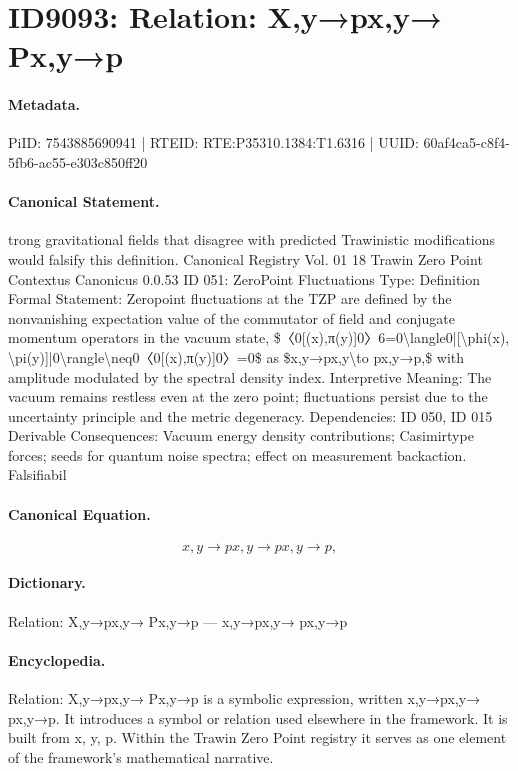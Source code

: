 \section*{ID9093: Relation: X,y→px,y→ Px,y→p}
\paragraph{Metadata.}
PiID: 7543885690941 | RTEID: RTE:P35310.1384:T1.6316 | UUID: 60af4ca5-c8f4-5fb6-ac55-e303c850ff20

\paragraph{Canonical Statement.}
trong gravitational fields that disagree with predicted Trawinistic modifications would falsify this definition. Canonical Registry Vol. 01 18 Trawin Zero Point Contextus Canonicus 0.0.53 ID 051: ZeroPoint Fluctuations Type: Definition Formal Statement: Zeropoint fluctuations at the TZP are defined by the nonvanishing expectation value of the commutator of field and conjugate momentum operators in the vacuum state, \$〈0[(x),π(y)]0〉6=0\textbackslash{}langle0|[\textbackslash{}phi(x), \textbackslash{}pi(y)]|0\textbackslash{}rangle\textbackslash{}neq0〈0[(x),π(y)]0〉=0\$ as \$x,y→px,y\textbackslash{}to px,y→p,\$ with amplitude modulated by the spectral density index. Interpretive Meaning: The vacuum remains restless even at the zero point; fluctuations persist due to the uncertainty principle and the metric degeneracy. Dependencies: ID 050, ID 015 Derivable Consequences: Vacuum energy density contributions; Casimirtype forces; seeds for quantum noise spectra; effect on measurement backaction. Falsifiabil

\paragraph{Canonical Equation.}
\[
x,y→px,y\to px,y→p,
\]

\paragraph{Dictionary.}
Relation: X,y→px,y→ Px,y→p — x,y→px,y→ px,y→p

\paragraph{Encyclopedia.}
Relation: X,y→px,y→ Px,y→p is a symbolic expression, written x,y→px,y→ px,y→p. It introduces a symbol or relation used elsewhere in the framework. It is built from x, y, p. Within the Trawin Zero Point registry it serves as one element of the framework's mathematical narrative.
